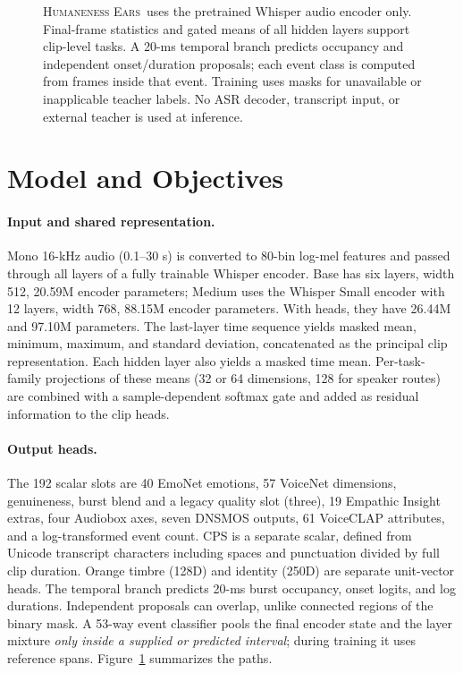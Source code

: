 \documentclass{article}
\newcommand{\he}{\textsc{Humaneness Ears}}
\begin{document}
\begin{figure}[t]
\centering
\caption{\he\ uses the pretrained Whisper audio encoder only. Final-frame statistics and gated means of all hidden layers support clip-level tasks. A 20-ms temporal branch predicts occupancy and independent onset/duration proposals; each event class is computed from frames inside that event. Training uses masks for unavailable or inapplicable teacher labels. No ASR decoder, transcript input, or external teacher is used at inference.}
\label{fig:architecture}
\end{figure}

\section{Model and Objectives}
\paragraph{Input and shared representation.}
Mono 16-kHz audio (0.1--30 s) is converted to 80-bin log-mel features and passed through all layers of a fully trainable Whisper encoder. Base has six layers, width 512, 20.59M encoder parameters; Medium uses the Whisper Small encoder with 12 layers, width 768, 88.15M encoder parameters. With heads, they have 26.44M and 97.10M parameters. The last-layer time sequence yields masked mean, minimum, maximum, and standard deviation, concatenated as the principal clip representation. Each hidden layer also yields a masked time mean. Per-task-family projections of these means (32 or 64 dimensions, 128 for speaker routes) are combined with a sample-dependent softmax gate and added as residual information to the clip heads.

\paragraph{Output heads.}
The 192 scalar slots are 40 EmoNet emotions, 57 VoiceNet dimensions, genuineness, burst blend and a legacy quality slot (three), 19 Empathic Insight extras, four Audiobox axes, seven DNSMOS outputs, 61 VoiceCLAP attributes, and a log-transformed event count. CPS is a separate scalar, defined from Unicode transcript characters including spaces and punctuation divided by full clip duration. Orange timbre (128D) and identity (250D) are separate unit-vector heads. The temporal branch predicts 20-ms burst occupancy, onset logits, and log durations. Independent proposals can overlap, unlike connected regions of the binary mask. A 53-way event classifier pools the final encoder state and the layer mixture \emph{only inside a supplied or predicted interval}; during training it uses reference spans. Figure~\ref{fig:architecture} summarizes the paths.
\end{document}
